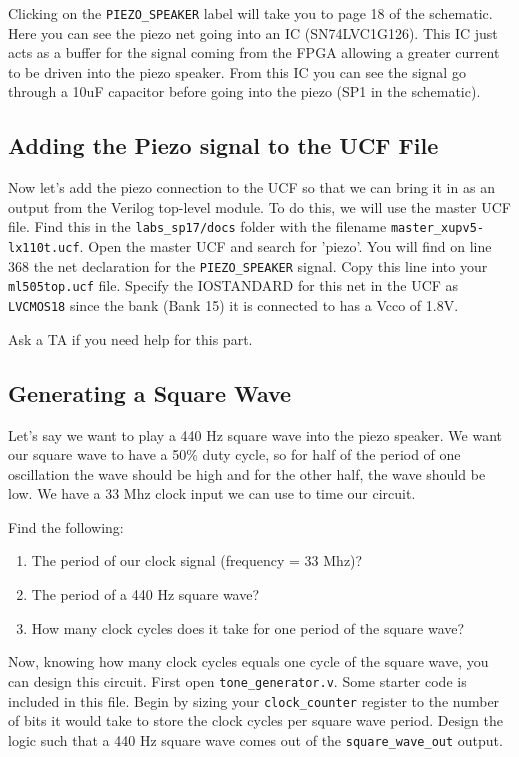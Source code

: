 \documentclass[11pt]{article}
\begin{document}
Clicking on the \verb|PIEZO_SPEAKER| label will take you to page 18 of the schematic. Here you can see the piezo net going into an IC (SN74LVC1G126). This IC just acts as a buffer for the signal coming from the FPGA allowing a greater current to be driven into the piezo speaker. From this IC you can see the signal go through a 10uF capacitor before going into the piezo (SP1 in the schematic).

\subsection{Adding the Piezo signal to the UCF File}
Now let's add the piezo connection to the UCF so that we can bring it in as an output from the Verilog top-level module. To do this, we will use the master UCF file. Find this in the \verb|labs_sp17/docs| folder with the filename \verb|master_xupv5-lx110t.ucf|. Open the master UCF and search for 'piezo'. You will find on line 368 the net declaration for the \verb|PIEZO_SPEAKER| signal. Copy this line into your \verb|ml505top.ucf| file. Specify the IOSTANDARD for this net in the UCF as \verb|LVCMOS18| since the bank (Bank 15) it is connected to has a Vcco of 1.8V.

Ask a TA if you need help for this part.

\subsection{Generating a Square Wave}
Let's say we want to play a 440 Hz square wave into the piezo speaker. We want our square wave to have a 50\% duty cycle, so for half of the period of one oscillation the wave should be high and for the other half, the wave should be low. We have a 33 Mhz clock input we can use to time our circuit.

Find the following:
\begin{enumerate}
	\item The period of our clock signal (frequency = 33 Mhz)?
	\item The period of a 440 Hz square wave?
	\item How many clock cycles does it take for one period of the square wave?
\end{enumerate}

Now, knowing how many clock cycles equals one cycle of the square wave, you can design this circuit. First open \verb|tone_generator.v|. Some starter code is included in this file. Begin by sizing your \verb|clock_counter| register to the number of bits it would take to store the clock cycles per square wave period. Design the logic such that a 440 Hz square wave comes out of the \verb|square_wave_out| output.
\end{document}

